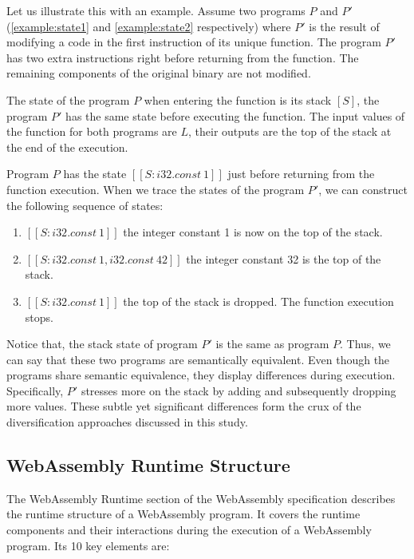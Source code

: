 
Let us illustrate this with an example.
Assume two programs $P$ and $P'$ (\autoref{example:state1} and \autoref{example:state2} respectively) where $P'$ is the result of modifying a code in the first instruction of its unique function.
The program $P'$ has two extra instructions right before returning from the function.
The remaining components of the original binary are not modified.




The state of the program $P$ when entering the function is its stack $[S]$, 
the program $P'$ has the same state before executing the function.
The input values of the function for both programs are $L$, their outputs are the top of the stack at the end of the execution.


Program $P$ has the state $[[S:i32.const\ 1]]$ just before returning from the function execution.
When we trace the states of the program $P'$, we can construct the following sequence of states:
\begin{enumerate}
    \item $[[S: i32.const\ 1]]$ the integer constant 1 is now on the top of the stack.
    \item $[[S: i32.const\ 1, i32.const\ 42]]$ the integer constant 32 is  the top of the stack.
    \item $[[S: i32.const\ 1]]$ the top of the stack is dropped. The function execution stops.
\end{enumerate}
Notice that, the stack state of program $P'$ is the same as program $P$.
Thus, we can say that these two programs are semantically equivalent.
Even though the programs share semantic equivalence, they display differences during execution. 
Specifically, $P'$ stresses more on the stack by adding and subsequently dropping more values.
These subtle yet significant differences form the crux of the diversification approaches discussed in this study.




\subsection{WebAssembly Runtime Structure}
\label{def:state}

The WebAssembly Runtime section of the WebAssembly specification \cite{webassembly_runtime} describes the runtime structure of a WebAssembly program. It covers the runtime components and their interactions during the execution of a WebAssembly program. Its 10 key elements are:

